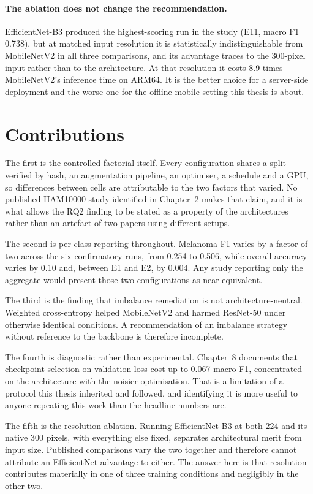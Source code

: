\paragraph{The ablation does not change the recommendation.} EfficientNet-B3 produced the
highest-scoring run in the study (E11, macro F1 0.738), but at matched input resolution it
is statistically indistinguishable from MobileNetV2 in all three comparisons, and its
advantage traces to the 300-pixel input rather than to the architecture. At that
resolution it costs 8.9 times MobileNetV2's inference time on ARM64. It is the better
choice for a server-side deployment and the worse one for the offline mobile setting this
thesis is about.

\section{Contributions}
\label{sec:conc-contrib}

The first is the controlled factorial itself. Every configuration shares a split
verified by hash, an augmentation pipeline, an optimiser, a schedule and a GPU, so
differences between cells are attributable to the two factors that varied. No published
HAM10000 study identified in Chapter~2 makes that claim, and it is what allows the RQ2
finding to be stated as a property of the architectures rather than an artefact of two
papers using different setups.

The second is per-class reporting throughout. Melanoma F1 varies by a factor of two
across the six confirmatory runs, from 0.254 to 0.506, while overall accuracy varies by
0.10 and, between E1 and E2, by 0.004. Any study reporting only the aggregate would
present those two configurations as near-equivalent.

The third is the finding that imbalance remediation is not architecture-neutral. Weighted
cross-entropy helped MobileNetV2 and harmed ResNet-50 under otherwise identical
conditions. A recommendation of an imbalance strategy without reference to the backbone
is therefore incomplete.

The fourth is diagnostic rather than experimental. Chapter~8 documents that checkpoint
selection on validation loss cost up to 0.067 macro F1, concentrated on the architecture
with the noisier optimisation. That is a limitation of a protocol this thesis inherited
and followed, and identifying it is more useful to anyone repeating this work than the
headline numbers are.

The fifth is the resolution ablation. Running EfficientNet-B3 at both 224 and its native
300 pixels, with everything else fixed, separates architectural merit from input size.
Published comparisons vary the two together and therefore cannot attribute an
EfficientNet advantage to either. The answer here is that resolution contributes
materially in one of three training conditions and negligibly in the other two.

